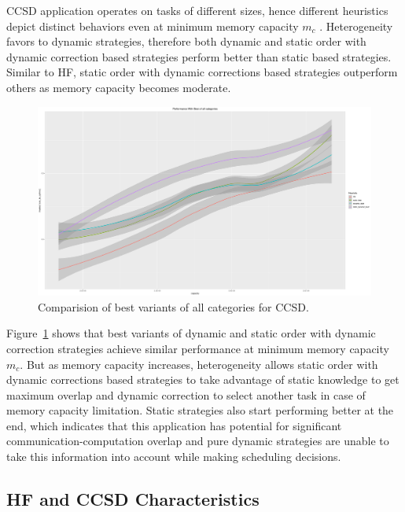 \documentclass[sigconf]{acmart}
\begin{document}
{	CCSD application operates on tasks of different sizes, hence different heuristics depict distinct behaviors even at minimum memory capacity $m_c$ . Heterogeneity favors to dynamic strategies, therefore both dynamic and static order with dynamic correction based strategies perform better than  static based strategies. Similar to HF,  static order with dynamic corrections based strategies outperform others as memory capacity becomes moderate. 
	
	
	\begin{figure}[htb]
		\includegraphics[scale=0.15]{./results/plots/inverse_ratio_to_optimal_ccsd-best.pdf}
		\caption{Comparision of best variants of all categories for CCSD.}
		\label{fig:ratio_to_optimal_best_ccsd}
	\end{figure}
	
	Figure~\ref{fig:ratio_to_optimal_best_ccsd} shows that best variants of dynamic and static order with dynamic correction  strategies achieve similar performance at minimum memory capacity $m_c$. But as memory capacity increases, heterogeneity allows static order with dynamic corrections based strategies to take advantage of static knowledge to get maximum overlap and dynamic correction to select another task in case of memory capacity limitation. Static strategies also start performing better at the end, which indicates that this application has potential for significant communication-computation overlap and pure dynamic strategies are unable to take this information into account while making scheduling decisions.
	
	\subsection{HF and CCSD Characteristics}
	
}
\end{document}
